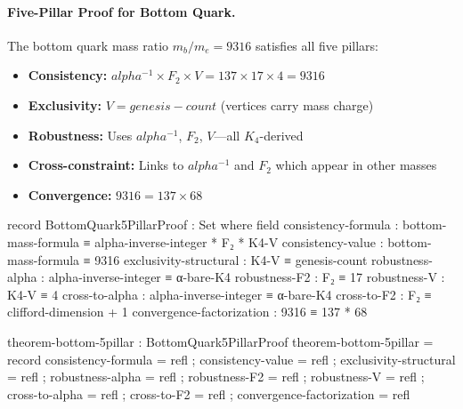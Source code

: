 \documentclass[11pt,a4paper]{book}
\def\alpha{alpha}%
\def\text#1{#1}%
\begin{document}
\paragraph{Five-Pillar Proof for Bottom Quark.}
The bottom quark mass ratio $m_b/m_e = 9316$ satisfies all five pillars:
\begin{itemize}
\item \textbf{Consistency:} $\alpha^{-1} \times F_2 \times V = 137 \times 17 \times 4 = 9316$
\item \textbf{Exclusivity:} $V = \text{genesis-count}$ (vertices carry mass charge)
\item \textbf{Robustness:} Uses $\alpha^{-1}$, $F_2$, $V$---all $K_4$-derived
\item \textbf{Cross-constraint:} Links to $\alpha^{-1}$ and $F_2$ which appear in other masses
\item \textbf{Convergence:} $9316 = 137 \times 68$
\end{itemize}

\begin{code}
record BottomQuark5PillarProof : Set where
  field
    consistency-formula : bottom-mass-formula ≡ alpha-inverse-integer * F₂ * K4-V
    consistency-value : bottom-mass-formula ≡ 9316
    exclusivity-structural : K4-V ≡ genesis-count
    robustness-alpha : alpha-inverse-integer ≡ α-bare-K4
    robustness-F2 : F₂ ≡ 17
    robustness-V : K4-V ≡ 4
    cross-to-alpha : alpha-inverse-integer ≡ α-bare-K4
    cross-to-F2 : F₂ ≡ clifford-dimension + 1
    convergence-factorization : 9316 ≡ 137 * 68
    
theorem-bottom-5pillar : BottomQuark5PillarProof
theorem-bottom-5pillar = record
  { consistency-formula = refl
  ; consistency-value = refl
  ; exclusivity-structural = refl
  ; robustness-alpha = refl
  ; robustness-F2 = refl
  ; robustness-V = refl
  ; cross-to-alpha = refl
  ; cross-to-F2 = refl
  ; convergence-factorization = refl
  }
\end{code}
\end{document}
